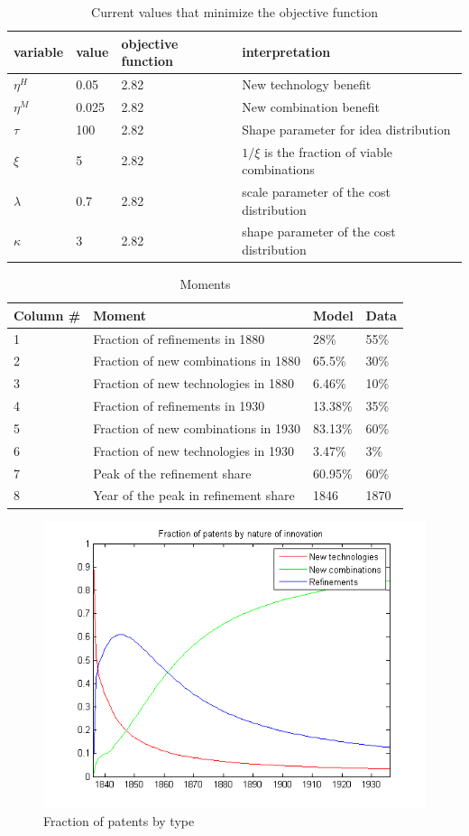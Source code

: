 \documentclass[a4paper,11pt]{article}
\begin{document}
\begin{table}
\centering
\begin{tabular}{llll}
\hline \hline
variable & value & objective function & interpretation \\ \hline
$\eta^H$ & 0.05 & 2.82 & New technology benefit \\
$\eta^M$ & 0.025 & 2.82 & New combination benefit \\
$\tau$ & 100 & 2.82 & Shape parameter for idea distribution \\
$\xi$ & 5 & 2.82 & $1/\xi$ is the fraction of viable combinations \\
$\lambda $ & 0.7 & 2.82 & scale parameter of the cost distribution \\
$\kappa $ & 3 & 2.82 & shape parameter of the cost distribution \\
\hline \hline
\end{tabular}
\caption{Current values that minimize the objective function}
\end{table}


\begin{table}
\centering
\begin{tabular}{llll}
\hline \hline
Column \# & Moment & Model & Data \\ \hline
1 & Fraction of refinements in 1880 & 28\% & 55\% \\
2 & Fraction of new combinations in 1880 & 65.5\% & 30\% \\
3 & Fraction of new technologies in 1880 & 6.46\% & 10\% \\
4 & Fraction of refinements in 1930 & 13.38\% & 35\% \\
5 & Fraction of new combinations in 1930 & 83.13\% & 60\% \\
6 & Fraction of new technologies in 1930 & 3.47\% & 3\% \\
7 & Peak of the refinement share & 60.95\% & 60\% \\
8 & Year of the peak in refinement share & 1846 & 1870 \\
\hline \hline
\end{tabular}
\caption{Moments}
\end{table}


\begin{figure}
\begin{center}
\includegraphics[scale=.8]{fractions2.png}
\caption{Fraction of patents by type}
\end{center}
\end{figure}
\end{document}
